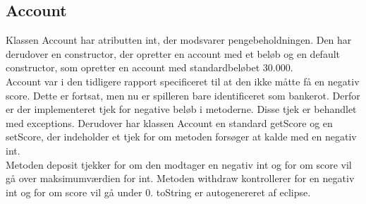 \subsection*{Account}
Klassen Account har atributten int, der modsvarer pengebeholdningen. Den har
derudover en constructor, der opretter en account med et beløb og en default
constructor, som opretter en account med standardbeløbet 30.000.\\
\indent Account var i den tidligere rapport specificeret til at den ikke måtte
få en negativ score. Dette er fortsat, men nu er spilleren bare identificeret
som bankerot. Derfor er der implementeret tjek for negative beløb i metoderne.
Disse tjek er behandlet med exceptions. Derudover har klassen Account en
standard getScore og en setScore, der indeholder et tjek for om metoden forsøger
at kalde med en negativ int.\\
\indent Metoden deposit tjekker for om den modtager en negativ int og for om
score vil gå over maksimumværdien for int. Metoden withdraw kontrollerer for en
negativ int og for om score vil gå under 0. toString er autogenereret af eclipse.
